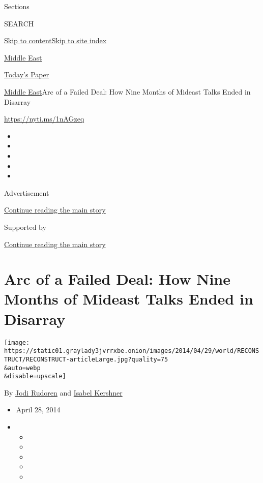Sections

SEARCH

\protect\hyperlink{site-content}{Skip to
content}\protect\hyperlink{site-index}{Skip to site index}

\href{https://www.nytimes3xbfgragh.onion/section/world/middleeast}{Middle
East}

\href{https://myaccount.nytimes3xbfgragh.onion/auth/login?response_type=cookie\&client_id=vi}{}

\href{https://www.nytimes3xbfgragh.onion/section/todayspaper}{Today's
Paper}

\href{/section/world/middleeast}{Middle East}\textbar{}Arc of a Failed
Deal: How Nine Months of Mideast Talks Ended in Disarray

\url{https://nyti.ms/1nAGzeq}

\begin{itemize}
\item
\item
\item
\item
\item
\end{itemize}

Advertisement

\protect\hyperlink{after-top}{Continue reading the main story}

Supported by

\protect\hyperlink{after-sponsor}{Continue reading the main story}

\hypertarget{arc-of-a-failed-deal-how-nine-months-of-mideast-talks-ended-in-disarray}{%
\section{Arc of a Failed Deal: How Nine Months of Mideast Talks Ended in
Disarray}\label{arc-of-a-failed-deal-how-nine-months-of-mideast-talks-ended-in-disarray}}

\texttt{[image: https://static01.graylady3jvrrxbe.onion/images/2014/04/29/world/RECONSTRUCT/RECONSTRUCT-articleLarge.jpg?quality=75\\\&auto=webp\\\&disable=upscale]}

By \href{http://www.nytimes3xbfgragh.onion/by/jodi-rudoren}{Jodi
Rudoren} and
\href{https://www.nytimes3xbfgragh.onion/by/isabel-kershner}{Isabel
Kershner}

\begin{itemize}
\item
  April 28, 2014
\item
  \begin{itemize}
  \item
  \item
  \item
  \item
  \item
  \end{itemize}
\end{itemize}

